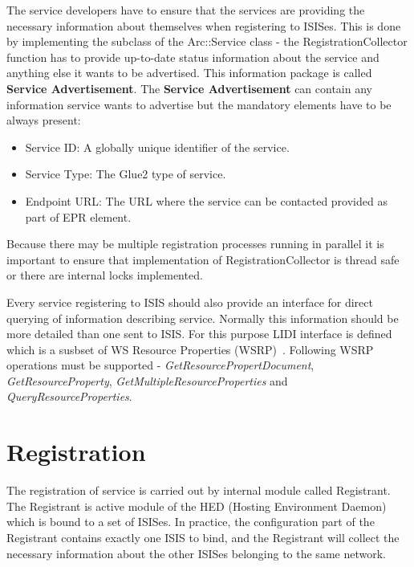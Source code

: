 \documentclass{book}
\begin{document}
The service developers have to ensure that the services are providing the necessary information about 
themselves when registering to ISISes. This is done by implementing the subclass of the Arc::Service class - 
the RegistrationCollector function has to provide up-to-date status information about the service and anything 
else it wants to be advertised. This information package is called \textbf{Service Advertisement}.
\label{service_advertisement}
The \textbf{Service Advertisement} can contain any information service wants to advertise but the mandatory 
elements have to be always present:
\begin{itemize}
  \item Service ID: A globally unique identifier of the service.
  \item Service Type: The Glue2 type of service.
  \item Endpoint URL: The URL where the service can be contacted provided as part of EPR element.
\end{itemize}

Because there may be multiple registration processes running in parallel it is important to ensure that 
implementation of RegistrationCollector is thread safe or there are internal locks implemented.

Every service registering to ISIS should also provide an interface for direct querying of information 
describing service. Normally this information should be more detailed than one sent to ISIS. For this 
purpose LIDI interface is defined which is a susbset of WS Resource Properties (WSRP)~\cite{wsrf-rp}. Following WSRP
operations must be supported - \textit{GetResourcePropertDocument}, \textit{GetResourceProperty},
\textit{GetMultipleResourceProperties} and \textit{QueryResourceProperties}.




\section{Registration}
\label{sec:service_registration}

The registration of service is carried out by internal module called Registrant. The Registrant is active module of the HED (Hosting Environment Daemon) which is bound to a set of ISISes. In practice, the configuration part of the Registrant contains exactly one ISIS to bind, and the Registrant will collect the necessary information about the other ISISes belonging to the same network.
\end{document}
